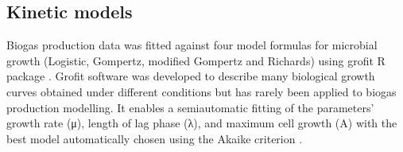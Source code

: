 \subsection{Kinetic models}
Biogas production data was fitted against four model formulas for microbial growth (Logistic, Gompertz, modified Gompertz and Richards) using grofit R package \cite{Kahm_2010}. Grofit software was developed to describe many biological growth curves obtained under different conditions but has rarely been applied to biogas production modelling. It enables a semiautomatic fitting of the parameters’ growth rate (μ), length of lag phase (λ), and maximum cell growth (A) with the best model automatically chosen using the Akaike criterion \cite{Hasenbrink_2006}.
